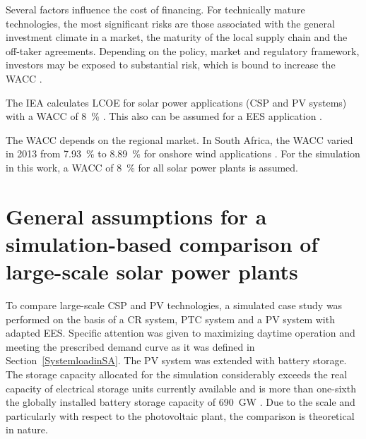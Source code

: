 Several factors influence the cost of financing. For technically mature technologies, the most significant risks are those associated with the general investment climate in a market, the maturity of the local supply chain and the off-taker agreements. Depending on the policy, market and regulatory framework, investors may be exposed to substantial risk, which is bound to increase the \ac{WACC} \cite{IEA2014c}.


The \ac{IEA} calculates \ac{LCOE} for solar power applications (\ac{CSP} and \ac{PV} systems) with a \ac{WACC} of \SI{8}{\percent} \cite{IEA2014c}. This also can be assumed for a \ac{EES} application \cite{Zakeri2015}.


The \ac{WACC} depends on the regional market. In South Africa, the \ac{WACC} varied in 2013 from \SI{7.93}{\percent} to \SI{8.89}{\percent} for onshore wind applications \cite{IEA2015}. For the simulation in this work, a \ac{WACC} of \SI{8}{\percent} for all solar power plants is assumed.

\section{General assumptions for a simulation-based comparison of large-scale solar power plants} \label{General assumptions}
To compare large-scale \ac{CSP} and \ac{PV} technologies, a simulated case study was performed on the basis of a \ac{CR} system, \ac{PTC} system and a \ac{PV} system with adapted \ac{EES}. Specific attention was given to maximizing daytime operation and meeting the prescribed demand curve as it was defined in Section~\ref{SystemloadinSA}. The \ac{PV} system was extended with battery storage. The storage capacity allocated for the simulation considerably exceeds the real capacity of electrical storage units currently available and is more than one-sixth the globally installed battery storage capacity of \SI{690}{GW} \cite{IEA2015}. Due to the scale and particularly with respect to the photovoltaic plant, the comparison is theoretical in nature.


